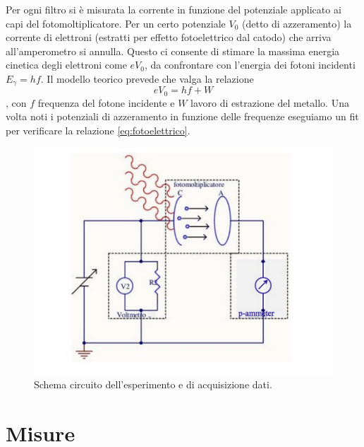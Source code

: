 \documentclass[10pt,a4paper]{article}
\begin{document}
Per ogni filtro si è misurata la corrente in funzione del potenziale applicato ai capi del fotomoltiplicatore. Per un certo potenziale $V_0$ (detto di azzeramento) la corrente di elettroni (estratti per effetto fotoelettrico dal catodo) che arriva all'amperometro si annulla. Questo ci consente di stimare la massima energia cinetica degli elettroni come $eV_0$, da confrontare con l'energia dei fotoni incidenti $E_{\gamma}=hf$. 
 Il modello teorico prevede che valga la relazione
 \begin{equation}\label{eq:fotoelettrico}
 eV_0 = hf + W
 \end{equation}, con $f$ frequenza del fotone incidente e $W$ lavoro di estrazione del metallo. Una volta noti i potenziali di azzeramento in funzione delle frequenze eseguiamo un fit per verificare la relazione \ref{eq:fotoelettrico}.
\begin{figure}[!htb]
  \centering
  \includegraphics[scale=1.0]{circuito.png}
\caption{Schema circuito dell'esperimento e di acquisizione dati.\label{circuito}}
\end{figure}


\section{Misure}
\end{document}
